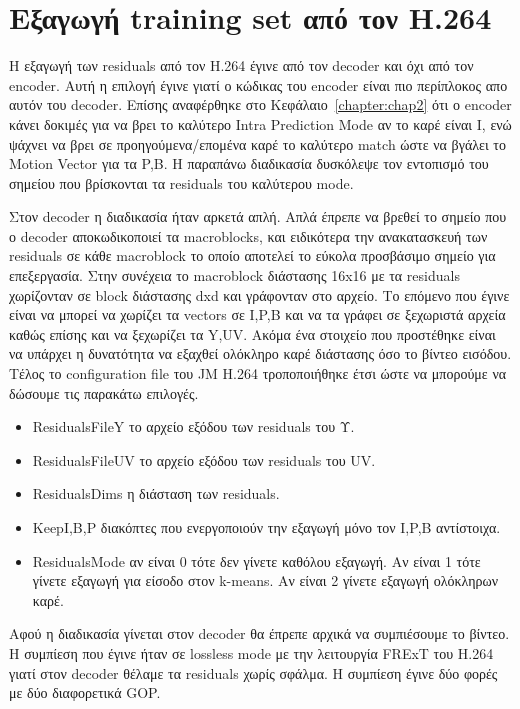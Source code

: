 \newpage

\section{Εξαγωγή training set από τον H.264}
\label{section:sect43}

\indent Η εξαγωγή των residuals από τον H.264 έγινε από τον decoder και όχι από τον encoder. Αυτή η επιλογή έγινε γιατί ο κώδικας του encoder είναι πιο περίπλοκος απο αυτόν του decoder. Επίσης αναφέρθηκε στο Κεφάλαιο~\ref{chapter:chap2} ότι ο encoder κάνει δοκιμές για να βρει το καλύτερο Intra Prediction Mode αν το καρέ είναι I, ενώ ψάχνει να βρει σε προηγούμενα/επομένα καρέ το καλύτερο match ώστε να βγάλει το Motion Vector για τα P,B. Η παραπάνω διαδικασία δυσκόλεψε τον εντοπισμό του σημείου που βρίσκονται τα residuals του καλύτερου mode.

\indent Στον decoder η διαδικασία ήταν αρκετά απλή. Απλά έπρεπε να βρεθεί το σημείο που ο decoder αποκωδικοποιεί τα macroblocks, και ειδικότερα την ανακατασκευή των residuals σε κάθε macroblock το οποίο αποτελεί το εύκολα προσβάσιμο σημείο για επεξεργασία. Στην συνέχεια το macroblock διάστασης 16x16 με τα residuals χωρίζονταν σε block διάστασης dxd και γράφονταν στο αρχείο. Το επόμενο που έγινε είναι να μπορεί να χωρίζει τα vectors σε I,P,B και να τα γράφει σε ξεχωριστά αρχεία καθώς επίσης και να ξεχωρίζει τα Y,UV. Ακόμα ένα στοιχείο που προστέθηκε είναι να υπάρχει η δυνατότητα να εξαχθεί ολόκληρο καρέ διάστασης όσο το βίντεο εισόδου. Τέλος το configuration file του JM H.264 \cite{misc:jm} τροποποιήθηκε έτσι ώστε να μπορούμε να δώσουμε τις παρακάτω επιλογές.

\begin{itemize}
    \item ResidualsFileY το αρχείο εξόδου των residuals του Υ.
    \item ResidualsFileUV το αρχείο εξόδου των residuals του UV.
    \item ResidualsDims η διάσταση των residuals.
    \item KeepI,B,P διακόπτες που ενεργοποιούν την εξαγωγή μόνο τον I,P,B αντίστοιχα.
    \item ResidualsMode αν είναι 0 τότε δεν γίνετε καθόλου εξαγωγή. Αν είναι 1 τότε γίνετε εξαγωγή για είσοδο στον k-means. Αν είναι 2 γίνετε εξαγωγή ολόκληρων καρέ.
\end{itemize}

\indent Αφού η διαδικασία γίνεται στον decoder θα έπρεπε αρχικά να συμπιέσουμε το βίντεο. Η συμπίεση που έγινε ήταν σε lossless mode με την λειτουργία FRExT του H.264 γιατί στον decoder θέλαμε τα residuals χωρίς σφάλμα. Η συμπίεση έγινε δύο φορές με δύο διαφορετικά GOP.

